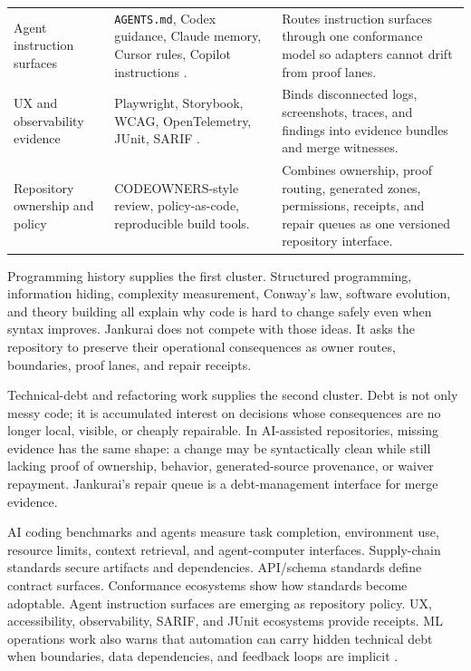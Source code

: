 \begin{table}[t]
\begin{tabularx}{\textwidth}{L{0.22\textwidth} Y Y}
Agent instruction surfaces & \texttt{AGENTS.md}, Codex guidance, Claude memory, Cursor rules, Copilot instructions \cite{agentsMdSpec2026,openaiCodexAgentsMd2026,claudeCodeMemoryDocs2026,cursorRulesDocs2026,githubCopilotInstructions2026}. & Routes instruction surfaces through one conformance model so adapters cannot drift from proof lanes. \\
UX and observability evidence & Playwright, Storybook, WCAG, OpenTelemetry, JUnit, SARIF \cite{playwrightBestPractices2026,playwrightVisualComparisons2026,storybookVisualTests2026,storybookAccessibility2026,wcagTargetSizeMinimum2026,openTelemetryDocs2025,sarifSpec2023}. & Binds disconnected logs, screenshots, traces, and findings into evidence bundles and merge witnesses. \\
Repository ownership and policy & CODEOWNERS-style review, policy-as-code, reproducible build tools. & Combines ownership, proof routing, generated zones, permissions, receipts, and repair queues as one versioned repository interface. \\
\bottomrule
\end{tabularx}
\end{table}

Programming history supplies the first cluster. Structured programming, information hiding, complexity measurement, Conway's law, software evolution, and theory building all explain why code is hard to change safely even when syntax improves. Jankurai does not compete with those ideas. It asks the repository to preserve their operational consequences as owner routes, boundaries, proof lanes, and repair receipts.

Technical-debt and refactoring work supplies the second cluster. Debt is not only messy code; it is accumulated interest on decisions whose consequences are no longer local, visible, or cheaply repairable. In AI-assisted repositories, missing evidence has the same shape: a change may be syntactically clean while still lacking proof of ownership, behavior, generated-source provenance, or waiver repayment. Jankurai's repair queue is a debt-management interface for merge evidence.

AI coding benchmarks and agents measure task completion, environment use, resource limits, context retrieval, and agent-computer interfaces. Supply-chain standards secure artifacts and dependencies. API/schema standards define contract surfaces. Conformance ecosystems show how standards become adoptable. Agent instruction surfaces are emerging as repository policy. UX, accessibility, observability, SARIF, and JUnit ecosystems provide receipts. ML operations work also warns that automation can carry hidden technical debt when boundaries, data dependencies, and feedback loops are implicit \cite{sculleyHiddenTechnicalDebt2015}.

